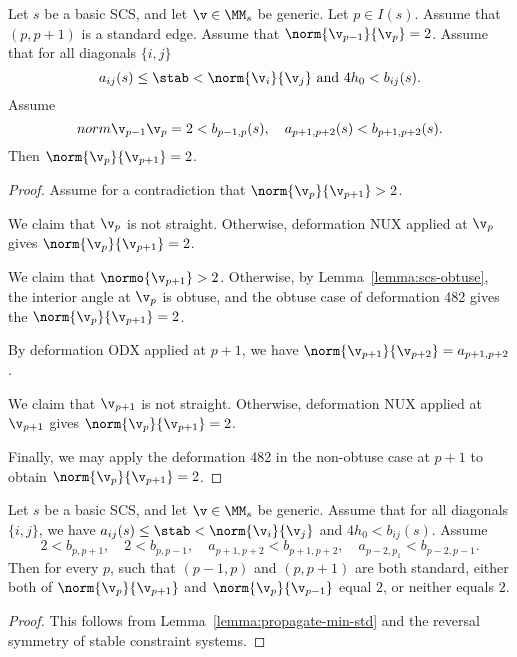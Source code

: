\begin{lemma}\label{lemma:propagate-min-std}
Let $s$ be a basic SCS, and let $\v\in \MM_s$ be generic.  Let $p\in I(s)$.
Assume  that $(p,p+1)$ is a standard
edge.  Assume that $\norm{\v_{p-1}}{\v_p} = 2$.  
Assume that for all diagonals $\{i,j\}$
\[
a_{ij}(s)\le \stab < \norm{\v_i}{\v_j} \text{ and } 4h_0 < b_{ij}(s).
\]
Assume
\[
norm{\v_{p-1}}{\v_p} = 2 < b_{p-1,p}(s),\quad a_{p+1,p+2}(s) < b_{p+1,p+2}(s).
\]
Then $\norm{\v_p}{\v_{p+1}}=2$.
\end{lemma}

\begin{proof} Assume for a contradiction that $\norm{\v_p}{\v_{p+1}}>2$.

We claim that $\v_p$ is not straight.  Otherwise, deformation  NUX applied at $\v_p$ gives
$\norm{\v_p}{\v_{p+1}} = 2$.

We claim that $\normo{\v_{p+1}}>2$.  Otherwise, by Lemma~\ref{lemma:scs-obtuse}, the interior angle
at $\v_p$ is obtuse, and the obtuse case of deformation 482 gives the $\norm{\v_p}{\v_{p+1}} = 2$.

By deformation ODX applied at $p+1$, we have $\norm{\v_{p+1}}{\v_{p+2}} =a_{p+1,p+2}$.

We claim that $\v_{p+1}$ is not straight.  Otherwise, deformation  NUX applied at $\v_{p+1}$ gives
$\norm{\v_p}{\v_{p+1}} = 2$.

Finally, we may apply the deformation 482 in the non-obtuse case at $p+1$ to obtain $\norm{\v_p}{\v_{p+1}}=2$.
\end{proof}

\begin{lemma}\label{lemma:propagate-min-std2}
Let $s$ be a basic SCS, and let $\v\in \MM_s$ be generic.   Assume that
for all diagonals $\{i,j\}$, we have
$a_{ij}(s)\le \stab < \norm{\v_i}{\v_j}$ and $4h_0 < b_{ij}(s)$.
Assume
\[
2 < b_{p,p+1},\quad 2 < b_{p,p-1},\quad a_{p+1,p+2}<b_{p+1,p+2},\quad a_{p-2,p_1} < b_{p-2,p-1}.
\]
Then for every $p$, such that $(p-1,p)$ and $(p,p+1)$ are both standard, either
both of $\norm{\v_{p}}{\v_{p+1}}$ and $\norm{\v_p}{\v_{p-1}}$ equal $2$, or neither equals $2$.
\end{lemma}

\begin{proof}
This follows from Lemma~\ref{lemma:propagate-min-std} and the reversal symmetry of stable constraint systems.
\end{proof}

